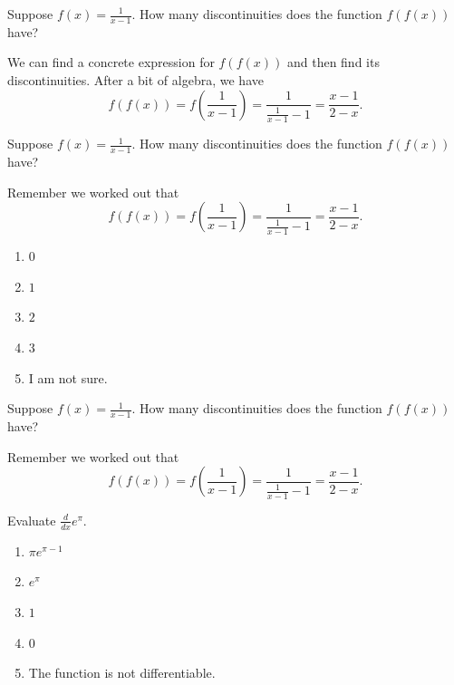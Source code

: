 \documentclass[aspectratio=169, 12pt]{beamer}
\begin{document}
\begin{frame}[t]
  Suppose \(f(x) = \frac{1}{x - 1}\). How many discontinuities does the function \(f(f(x))\) have?

  \pause
  We can find a concrete expression for \(f(f(x))\) and then find its discontinuities. After a bit of algebra, we have
  \[
    f(f(x)) = f\left(\frac{1}{x - 1}\right) = \frac{1}{\frac{1}{x - 1} - 1} = \frac{x - 1}{2 - x}.
  \]
\end{frame}


\begin{poll}[t]
  Suppose \(f(x) = \frac{1}{x - 1}\). How many discontinuities does the function \(f(f(x))\) have?

  Remember we worked out that
  \[
    f(f(x)) = f\left(\frac{1}{x - 1}\right) = \frac{1}{\frac{1}{x - 1} - 1} = \frac{x - 1}{2 - x}.
  \]

  \bigskip
  \begin{enumerate}[label=\Alph*.]
    \item \(0\)
    \item \(1\)
    \item \(2\)
    \item \(3\)
    \item I am not sure.
  \end{enumerate}
\end{poll}

\begin{frame}[t]
  Suppose \(f(x) = \frac{1}{x - 1}\). How many discontinuities does the function \(f(f(x))\) have?

  Remember we worked out that
  \[
    f(f(x)) = f\left(\frac{1}{x - 1}\right) = \frac{1}{\frac{1}{x - 1} - 1} = \frac{x - 1}{2 - x}.
  \]


  \pause
\end{frame}

\begin{poll}
  Evaluate \(\frac{d}{dx} e^{\pi}\).

  \begin{enumerate}
    \item \(\pi e^{\pi - 1}\)
    \item \(e^{\pi}\)
    \item \(1\)
    \item \(0\)
    \item The function is not differentiable.
  \end{enumerate}
\end{poll}
\end{document}
